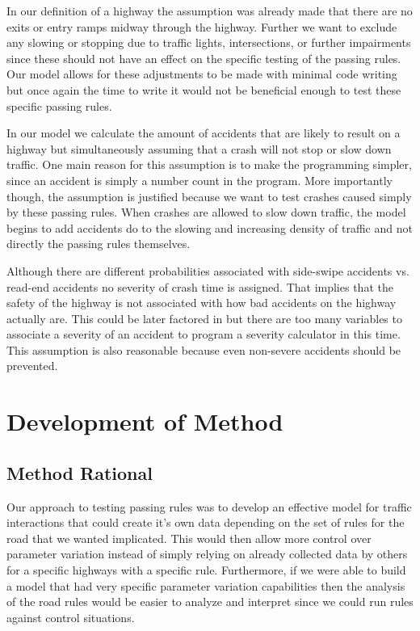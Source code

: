 \documentclass{amsart}
\begin{document}
		 In our definition of a highway the assumption was already made that there are no exits or entry ramps midway through the highway.  Further we want to exclude any slowing or stopping due to traffic lights, intersections, or further impairments since these should not have an effect on the specific testing of the passing rules.  Our model allows for these adjustments to be made with minimal code writing but once again the time to write it would not be beneficial enough to test these specific passing rules.  

		In our model we calculate the amount of accidents that are likely to result on a highway but simultaneously assuming that a crash will not stop or slow down traffic.  One main reason for this assumption is to make the programming simpler, since an accident is simply a number count in the program.  More importantly though, the assumption is justified because we want to test crashes caused simply by these passing rules.  When crashes are allowed to slow down traffic, the model begins to add accidents do to the slowing and increasing density of traffic and not directly the passing rules themselves.  

	Although there are different probabilities associated with side-swipe accidents vs. read-end accidents no severity of crash time is assigned.  That implies that the safety of the highway is not associated with how bad accidents on the highway actually are.  This could be later factored in but there are too many variables to associate a severity of an accident to program a severity calculator in this time.  This assumption is also reasonable because even non-severe accidents should  be prevented. 
		


\section{\bfseries{Development of Method}}
	\subsection{Method Rational}
	Our approach to testing passing rules was to develop an effective model for traffic interactions that could create it's own data depending on the set of rules for the road that we wanted implicated.  This would then allow more control over parameter variation instead of simply relying on already collected data by others for a specific highways with a specific rule.  Furthermore, if we were able to build a model that had very specific parameter variation capabilities then the analysis of the road rules would be easier to analyze and interpret since we could run rules against control situations.  
	
\end{document}
